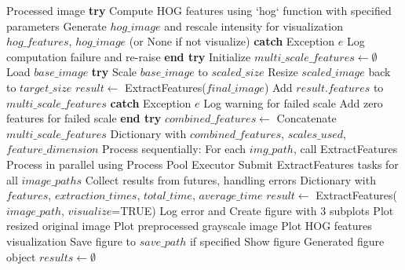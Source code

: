 \begin{algorithm}[!htbp]
\begin{algorithmic}[1]
    \Return Processed image
\EndProcedure
\Statex
{}
    \State \textbf{try}
        \State Compute HOG features using `hog` function with specified parameters
            \State Generate $hog\_image$ and rescale intensity for visualization
        \EndIf
        \Return $hog\_features$, $hog\_image$ (or None if not visualize)
    \State \textbf{catch} {Exception $e$}
        \State Log computation failure and re-raise
    \State \textbf{end try}
\EndProcedure
\Statex
{}
    \State Initialize $multi\_scale\_features \leftarrow \emptyset$
    \State Load $base\_image$
        \State \textbf{try}
            \State Scale $base\_image$ to $scaled\_size$
            \State Resize $scaled\_image$ back to $target\_size$
            \State $result \leftarrow$ ExtractFeatures($final\_image$)
            \State Add $result.features$ to $multi\_scale\_features$
        \State \textbf{catch} {Exception $e$}
            \State Log warning for failed scale
            \State Add zero features for failed scale
        \State \textbf{end try}
    \EndFor
    \State $combined\_features \leftarrow$ Concatenate $multi\_scale\_features$
    \Return Dictionary with $combined\_features$, $scales\_used$, $feature\_dimension$
\EndProcedure
\Statex
{}
        \State Process sequentially: For each $img\_path$, call ExtractFeatures
    \Else
        \State Process in parallel using Process Pool Executor
        \State Submit ExtractFeatures tasks for all $image\_paths$
        \State Collect results from futures, handling errors
    \EndIf
    \Return Dictionary with $features$, $extraction\_times$, $total\_time$, $average\_time$
\EndProcedure
\Statex
{}
    \State $result \leftarrow$ ExtractFeatures($image\_path$, $visualize$=TRUE)
     Log error and \Return \EndIf
    \State Create figure with 3 subplots
    \State Plot resized original image
    \State Plot preprocessed grayscale image
    \State Plot HOG features visualization
    \State Save figure to $save\_path$ if specified
    \State Show figure
    \Return Generated figure object
\EndProcedure
\Statex
{}
    \State $results \leftarrow \emptyset$

\end{algorithmic}
\end{algorithm}
